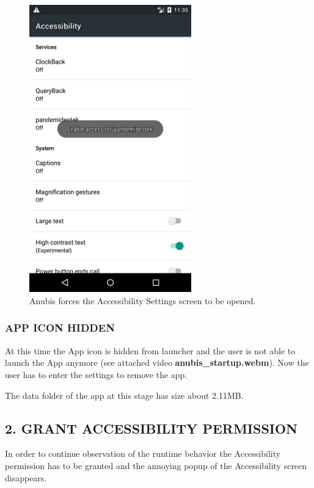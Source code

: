 \documentclass[10pt,titlepage]{article}
\begin{document}
\begin{figure}[H]
  \begin{center}
  \includegraphics[width=7cm]{anubis_accessibility.png}
  \end{center}
  \caption{Anubis forces the Accessibility Settings screen to be opened.}
  \label{fig:anubis_open_accessibiltiy}
\end{figure}


\subsubsection{APP ICON HIDDEN}
At this time the App icon is hidden from launcher and the user is not able to launch the App anymore (see attached video \textbf{anubis\_startup.webm}). Now the user has to enter the settings to remove the app.

The data folder of the app at this stage has size about 2.11MB.



\subsection{2. GRANT ACCESSIBILITY PERMISSION}
In order to continue observation of the runtime behavior the Accessibility permission has to be granted and the annoying popup of the Accessibility screen disappears.
\end{document}
